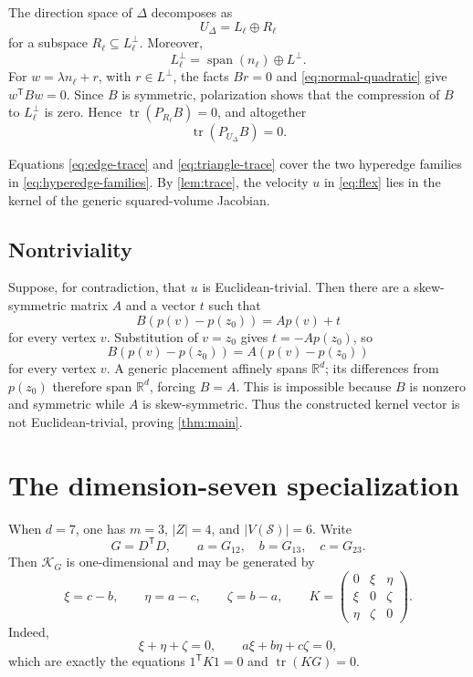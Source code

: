\documentclass[11pt]{article}
\theoremstyle{definition}
\newcommand{\R}{\mathbb{R}}
\newcommand{\cS}{\mathcal{S}}
\newcommand{\tr}{\operatorname{tr}}
\newcommand{\spanop}{\operatorname{span}}
\begin{document}
The direction space of \(\Delta\) decomposes as
\[
  U_\Delta=L_\ell\oplus R_\ell
\]
for a subspace \(R_\ell\subseteq L_\ell^\perp\).  Moreover,
\[
  L_\ell^\perp=\spanop(n_\ell)\oplus L^\perp.
\]
For \(w=\lambda n_\ell+r\), with \(r\in L^\perp\), the facts
\(Br=0\) and \eqref{eq:normal-quadratic} give
\(w^{\mathsf T}Bw=0\).  Since \(B\) is symmetric, polarization shows
that the compression of \(B\) to \(L_\ell^\perp\) is zero.  Hence
\(\tr(P_{R_\ell}B)=0\), and altogether
\begin{equation}
  \tr(P_{U_\Delta}B)=0.
  \label{eq:triangle-trace}
\end{equation}

Equations \eqref{eq:edge-trace} and \eqref{eq:triangle-trace} cover
the two hyperedge families in \eqref{eq:hyperedge-families}.  By
\cref{lem:trace}, the velocity \(u\) in \eqref{eq:flex} lies in the
kernel of the generic squared-volume Jacobian.

\subsection{Nontriviality}

Suppose, for contradiction, that \(u\) is Euclidean-trivial.  Then
there are a skew-symmetric matrix \(A\) and a vector \(t\) such that
\[
  B(p(v)-p(z_0))=Ap(v)+t
\]
for every vertex \(v\).  Substitution of \(v=z_0\) gives
\(t=-Ap(z_0)\), so
\[
  B(p(v)-p(z_0))=A(p(v)-p(z_0))
\]
for every vertex \(v\).  A generic placement affinely spans \(\R^d\);
its differences from \(p(z_0)\) therefore span \(\R^d\), forcing
\(B=A\).  This is impossible because \(B\) is nonzero and symmetric
while \(A\) is skew-symmetric.  Thus the constructed kernel vector is
not Euclidean-trivial, proving \cref{thm:main}.

\section{The dimension-seven specialization}
\label{sec:d7}

When \(d=7\), one has \(m=3\), \(|Z|=4\), and
\(|V(\cS)|=6\).  Write
\[
  G=D^{\mathsf T}D,\qquad
  a=G_{12},\quad b=G_{13},\quad c=G_{23}.
\]
Then \(\mathcal K_G\) is one-dimensional and may be generated by
\[
  \xi=c-b,\qquad \eta=a-c,\qquad \zeta=b-a,
  \qquad
  K=\begin{pmatrix}
      0&\xi&\eta\\
      \xi&0&\zeta\\
      \eta&\zeta&0
    \end{pmatrix}.
\]
Indeed,
\[
  \xi+\eta+\zeta=0,\qquad
  a\xi+b\eta+c\zeta=0,
\]
which are exactly the equations \(1^{\mathsf T}K1=0\) and
\(\tr(KG)=0\).
\end{document}
